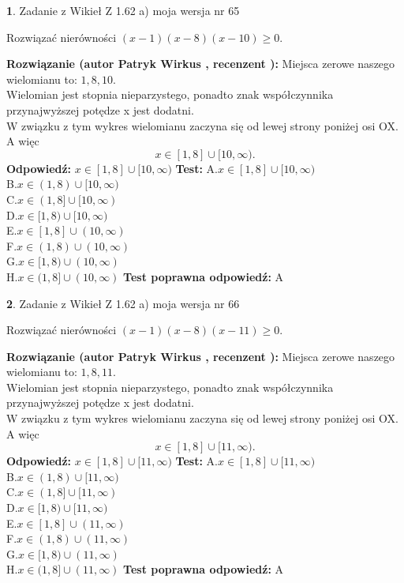 \documentclass[12pt, a4paper]{article}
\theoremstyle{definition} %
\newtheorem{zad}{}
\newcommand{\zadStart}[1]{\begin{zad}#1\newline}
\newcommand{\zadStop}{\end{zad}}
\newcommand{\rozwStart}[2]{\noindent \textbf{Rozwiązanie (autor #1 , recenzent #2): }\newline}
\newcommand{\rozwStop}{\newline}
\newcommand{\odpStart}{\noindent \textbf{Odpowiedź:}\newline}
\newcommand{\odpStop}{\newline}
\newcommand{\testStart}{\noindent \textbf{Test:}\newline}
\newcommand{\testStop}{\newline}
\newcommand{\kluczStart}{\noindent \textbf{Test poprawna odpowiedź:}\newline}
\newcommand{\kluczStop}{\newline}
\begin{document}
\zadStart{Zadanie z Wikieł Z 1.62 a) moja wersja nr 65}

Rozwiązać nierówności $(x-1)(x-8)(x-10)\ge0$.
\zadStop
\rozwStart{Patryk Wirkus}{}
Miejsca zerowe naszego wielomianu to: $1, 8, 10$.\\
Wielomian jest stopnia nieparzystego, ponadto znak współczynnika przy\linebreak najwyższej potędze x jest dodatni.\\ W związku z tym wykres wielomianu zaczyna się od lewej strony poniżej osi OX. A więc $$x \in [1,8] \cup [10,\infty).$$
\rozwStop
\odpStart
$x \in [1,8] \cup [10,\infty)$
\odpStop
\testStart
A.$x \in [1,8] \cup [10,\infty)$\\
B.$x \in (1,8) \cup [10,\infty)$\\
C.$x \in (1,8] \cup [10,\infty)$\\
D.$x \in [1,8) \cup [10,\infty)$\\
E.$x \in [1,8] \cup (10,\infty)$\\
F.$x \in (1,8) \cup (10,\infty)$\\
G.$x \in [1,8) \cup (10,\infty)$\\
H.$x \in (1,8] \cup (10,\infty)$
\testStop
\kluczStart
A
\kluczStop



\zadStart{Zadanie z Wikieł Z 1.62 a) moja wersja nr 66}

Rozwiązać nierówności $(x-1)(x-8)(x-11)\ge0$.
\zadStop
\rozwStart{Patryk Wirkus}{}
Miejsca zerowe naszego wielomianu to: $1, 8, 11$.\\
Wielomian jest stopnia nieparzystego, ponadto znak współczynnika przy\linebreak najwyższej potędze x jest dodatni.\\ W związku z tym wykres wielomianu zaczyna się od lewej strony poniżej osi OX. A więc $$x \in [1,8] \cup [11,\infty).$$
\rozwStop
\odpStart
$x \in [1,8] \cup [11,\infty)$
\odpStop
\testStart
A.$x \in [1,8] \cup [11,\infty)$\\
B.$x \in (1,8) \cup [11,\infty)$\\
C.$x \in (1,8] \cup [11,\infty)$\\
D.$x \in [1,8) \cup [11,\infty)$\\
E.$x \in [1,8] \cup (11,\infty)$\\
F.$x \in (1,8) \cup (11,\infty)$\\
G.$x \in [1,8) \cup (11,\infty)$\\
H.$x \in (1,8] \cup (11,\infty)$
\testStop
\kluczStart
A
\kluczStop
\end{document}
